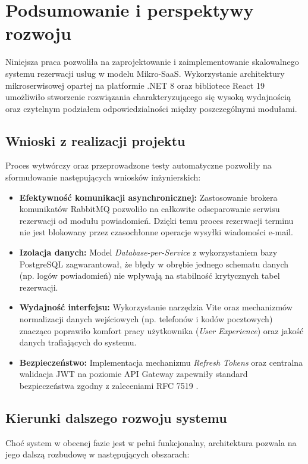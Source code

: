 \newpage
\renewcommand{\sectioncolor}{chap6}
\section{Podsumowanie i perspektywy rozwoju}

Niniejsza praca pozwoliła na zaprojektowanie i zaimplementowanie skalowalnego systemu rezerwacji usług w modelu Mikro-SaaS. Wykorzystanie architektury mikroserwisowej opartej na platformie .NET 8 \cite{dotnet_microsoft} oraz bibliotece React 19 \cite{react_meta} umożliwiło stworzenie rozwiązania charakteryzującego się wysoką wydajnością oraz czytelnym podziałem odpowiedzialności między poszczególnymi modułami.

\subsection{Wnioski z realizacji projektu}
Proces wytwórczy oraz przeprowadzone testy automatyczne \cite{vitest_guide} pozwoliły na sformułowanie następujących wniosków inżynierskich:

\begin{itemize}
    \item \textbf{Efektywność komunikacji asynchronicznej:} Zastosowanie brokera komunikatów RabbitMQ \cite{rabbitmq_docs} pozwoliło na całkowite odseparowanie serwisu rezerwacji od modułu powiadomień. Dzięki temu proces rezerwacji terminu nie jest blokowany przez czasochłonne operacje wysyłki wiadomości e-mail.
    \item \textbf{Izolacja danych:} Model \textit{Database-per-Service} z wykorzystaniem bazy PostgreSQL \cite{postgresql_docs} zagwarantował, że błędy w obrębie jednego schematu danych (np. logów powiadomień) nie wpływają na stabilność krytycznych tabel rezerwacji.
    \item \textbf{Wydajność interfejsu:} Wykorzystanie narzędzia Vite \cite{vite_guide} oraz mechanizmów normalizacji danych wejściowych (np. telefonów i kodów pocztowych) znacząco poprawiło komfort pracy użytkownika (\textit{User Experience}) oraz jakość danych trafiających do systemu.
    \item \textbf{Bezpieczeństwo:} Implementacja mechanizmu \textit{Refresh Tokens} oraz centralna walidacja JWT na poziomie API Gateway \cite{ocelot_docs} zapewniły standard bezpieczeństwa zgodny z zaleceniami RFC 7519 \cite{jwt_rfc}.
\end{itemize}

\subsection{Kierunki dalszego rozwoju systemu}
Choć system w obecnej fazie jest w pełni funkcjonalny, architektura pozwala na jego dalszą rozbudowę w następujących obszarach:

